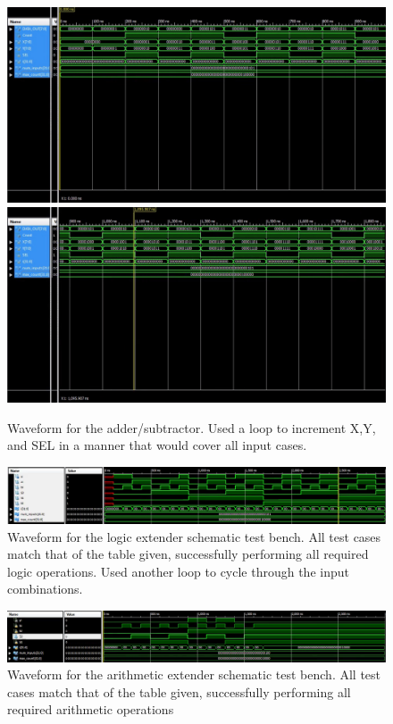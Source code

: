 \documentclass[12pt]{article}
\begin{document}
\begin{figure}[h!]
\centering
	\includegraphics[scale=.3]{alu_tb_wave1.jpeg}
	\includegraphics[scale=.3]{alu_tb_wave2.jpeg}
	\caption{Waveform for the adder/subtractor. Used a loop to increment X,Y, and SEL in a manner that would cover all input cases.}
\end{figure}

\begin{figure}[h!]
    \centering
	\includegraphics[scale=.33]{logic_ext_tb_wave}
	\caption{Waveform for the logic extender schematic test bench. All test cases match that of the table given, successfully performing all required logic operations. Used another loop to cycle through the input combinations.}
\end{figure}

\begin{figure}[h!]
    \centering
	\includegraphics[scale=.33]{arith_ext_tb_wave.png}
	\caption{Waveform for the arithmetic extender schematic test bench. All test cases match that of the table given, successfully performing all required arithmetic operations}
\end{figure}
\end{document}
